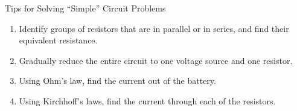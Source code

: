\documentclass[12pt,aspectratio=169]{beamer}
\begin{document}
%



\begin{frame}{Tips for Solving ``Simple'' Circuit Problems}
  \begin{enumerate}
  \item Identify groups of resistors that are in parallel or in series, and
    find their equivalent resistance.
  \item Gradually reduce the entire circuit to one voltage source and one
    resistor.
  \item Using Ohm's law, find the current out of the battery.
  \item Using Kirchhoff's laws, find the current through each of the resistors.
  \end{enumerate}
\end{frame}
\end{document}
